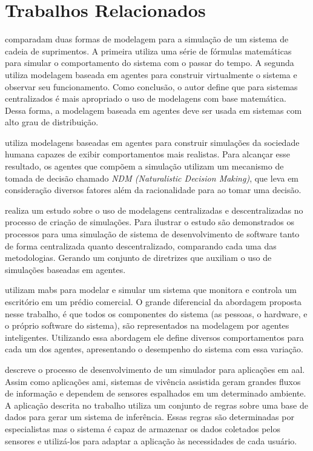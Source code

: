 \chapter{Trabalhos Relacionados}
\label{cap:trabalhos-relacionados}


 comparadam duas formas de modelagem para a simulação de um sistema de cadeia de suprimentos. A primeira utiliza uma série de fórmulas matemáticas para simular o comportamento do sistema com o passar do tempo. A segunda utiliza  modelagem baseada em agentes para construir virtualmente o sistema e observar seu funcionamento. Como conclusão, o autor define que para sistemas centralizados é mais apropriado o uso de modelagens com base matemática. Dessa forma, a modelagem baseada em agentes deve ser usada em sistemas com alto grau de distribuição.

 utiliza modelagens baseadas em agentes para construir simulações da sociedade humana capazes de exibir comportamentos mais realistas. Para alcançar esse resultado, os agentes que compõem a simulação utilizam um mecanismo de tomada de decisão chamado \textit{NDM (Naturalistic Decision Making)}, que leva em consideração diversos fatores além da racionalidade para ao tomar uma decisão. 

 realiza um estudo sobre o uso de modelagens centralizadas e descentralizadas no processo de criação de simulações. Para ilustrar o estudo são demonstrados  os processos para uma simulação de sistema de desenvolvimento de software tanto de forma centralizada quanto descentralizado, comparando cada uma das metodologias. Gerando um conjunto de diretrizes que auxiliam o uso de simulações baseadas em agentes.
 
 utilizam \acrshort{mabs} para modelar e simular um sistema que monitora e controla um escritório em um prédio comercial. O grande diferencial da abordagem proposta nesse trabalho, é que todos os componentes do sistema (as pessoas, o hardware, e o próprio software do sistema),  são representados na modelagem por agentes inteligentes. Utilizando essa abordagem ele define diversos comportamentos para cada um dos agentes, apresentando o desempenho do sistema com essa variação.

 descreve o processo de desenvolvimento de um simulador para aplicações em \acrfull{aal}. Assim como aplicações \acrshort{ami}, sistemas de vivência assistida geram grandes fluxos de informação e dependem de sensores espalhados em um determinado ambiente. A aplicação descrita no trabalho utiliza um conjunto de regras sobre uma base de dados para gerar um sistema de inferência. Essas regras são determinadas por especialistas mas o sistema é capaz de armazenar os dados coletados pelos sensores e utilizá-los para adaptar a aplicação às necessidades de cada usuário. 

